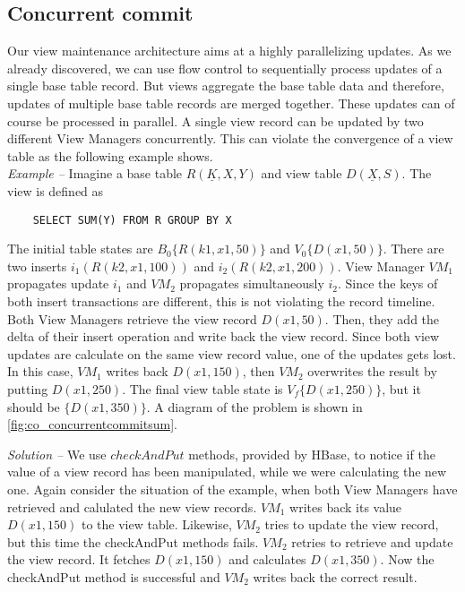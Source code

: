 \documentclass[11pt,a4paper,bibtotoc,idxtotoc,headsepline,footsepline,footexclude,BCOR12mm,DIV13]{scrbook}
\begin{document}
\subsection{Concurrent commit} 
Our view maintenance architecture aims at a highly parallelizing updates. As we already discovered, we can use flow control to sequentially process updates of a single base table record. But views aggregate the base table data and therefore, updates of multiple base table records are merged together. These updates can of course be processed in parallel. A single view record can be updated by two different View Managers concurrently. This can violate the convergence of a view table as the following example shows.\\ 

\noindent  
\emph{Example -- }Imagine a base table $R(\underline{K},X,Y)$ and view table $D(\underline{X},S)$. The view is defined as
\begin{verbatim}
	SELECT SUM(Y) FROM R GROUP BY X
\end{verbatim}
The initial table states are $B_0\{R(k1,x1,50)\}$ and $V_0\{D(x1,50)\}$. There are two inserts $i_1(R(k2,x1,100))$ and $i_2(R(k2,x1,200))$. View Manager $VM_1$ propagates update $i_1$ and $VM_2$ propagates simultaneously $i_2$. Since the keys of both insert transactions are different, this is not violating the record timeline. Both View Managers retrieve the view record  $D(x1,50)$. Then, they add the delta of their insert operation and write back the view record. Since both view updates are calculate on the same view record value, one of the updates gets lost. In this case, $VM_1$ writes back $D(x1,150)$, then $VM_2$ overwrites the result by putting $D(x1,250)$. The final view table state is $V_f\{D(x1,250)\}$, but it should be $\{D(x1,350)\}$. A diagram of the problem is shown in \ref{fig:co_concurrentcommitsum}.   

\noindent  
\emph{Solution -- }We use $checkAndPut$ methods, provided by HBase, to notice if the value of a view record has been manipulated, while we were calculating the new one. Again consider the situation of the example, when both View Managers have retrieved and calulated the new view records. $VM_1$ writes back its value $D(x1,150)$ to the view table. Likewise, $VM_2$ tries to update the view record, but this time the checkAndPut methods fails. $VM_2$ retries to retrieve and update the view record. It fetches $D(x1,150)$ and calculates $D(x1,350)$. Now the checkAndPut method is successful and $VM_2$ writes back the correct result.\\
\end{document}
